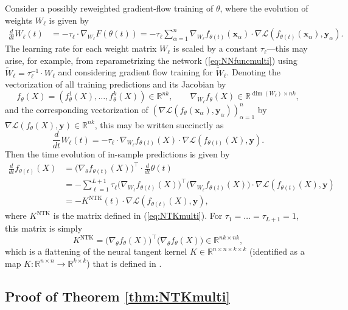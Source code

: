 \documentclass{article}
\theoremstyle{definition}
\newcommand{\R}{\mathbb{R}}
\newcommand{\NTK}{\text{NTK}}
\newcommand{\x}{\mathbf{x}}
\newcommand{\y}{\mathbf{y}}
\renewcommand{\a}{\alpha}
\newcommand{\1}{\mathbf{1}}
\begin{document}
Consider a possibly reweighted gradient-flow training of $\theta$,
where the evolution of weights $W_\ell$ is given by
\begin{align*}
\frac{d}{dt}W_\ell(t)&=-\tau_\ell \cdot
\nabla_{W_\ell} F(\theta(t))=-\tau_\ell
\sum_{\a=1}^n \nabla_{W_\ell} f_{\theta(t)}(\x_\a) \cdot \nabla
\mathcal{L}(f_{\theta(t)}(\x_\a),\y_\a).
\end{align*}
The learning rate for each weight matrix $W_\ell$ is
scaled by a constant $\tau_\ell$---this may arise, for example,
from reparametrizing the network (\ref{eq:NNfuncmulti}) using
$\widetilde{W}_\ell=\tau_\ell^{-1} \cdot W_\ell$ and considering
gradient flow training for $\widetilde{W}_\ell$. Denoting
the vectorization of all training predictions and its Jacobian by
\[f_\theta(X)=(f_\theta^1(X),\ldots,f_\theta^k(X)) \in \R^{nk},
\qquad \nabla_{W_\ell} f_\theta(X) \in \R^{\dim(W_\ell) \times nk},\]
and the corresponding vectorization of
$(\nabla \mathcal{L}(f_\theta(\x_\a),\y_\a))_{\a=1}^n$
by $\nabla \mathcal{L}(f_\theta(X),\y) \in \R^{nk}$,
this may be written succinctly as
\[\frac{d}{dt}W_\ell(t)=-\tau_\ell \cdot \nabla_{W_\ell} f_{\theta(t)}(X)
\cdot \nabla \mathcal{L}(f_{\theta(t)}(X),\y).\]
Then the time evolution of in-sample predictions is given by
\begin{align*}
\frac{d}{dt} f_{\theta(t)}(X)
&=\Big(\nabla_\theta f_{\theta(t)}(X)\Big)^\top
\cdot \frac{d}{dt}\theta(t)\\
&=-\sum_{\ell=1}^{L+1} \tau_\ell 
\Big(\nabla_{W_\ell} f_{\theta(t)}(X)\Big)^\top
\Big(\nabla_{W_\ell} f_{\theta(t)}(X)\Big) \cdot \nabla
\mathcal{L}(f_{\theta(t)}(X),\y)\\
&=-K^\NTK(t) \cdot \nabla \mathcal{L}(f_{\theta(t)}(X),\y),
\end{align*}
where $K^\NTK$ is the matrix defined in (\ref{eq:NTKmulti}).
For $\tau_1=\ldots=\tau_{L+1}=1$, this matrix is simply
\[K^\NTK=\Big(\nabla_\theta f_\theta(X)\Big)^\top
\Big(\nabla_\theta f_\theta(X)\Big) \in \R^{nk \times nk},\]
which is a flattening of the neural
tangent kernel $K \in \R^{n \times n \times k \times k}$ (identified as a map
$K:\R^{n \times n} \to \R^{k \times k}$) that is defined in
\cite{jacot2018neural}.

\subsection{Proof of Theorem \ref{thm:NTKmulti}}
\end{document}
